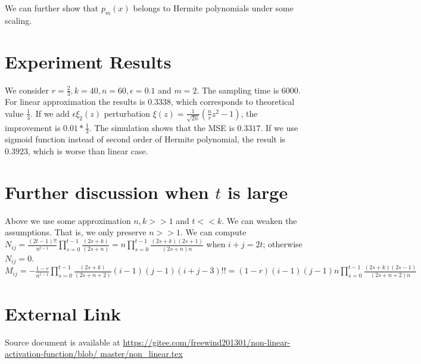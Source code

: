 \documentclass{article}
\begin{document}
We can further show that $p_m(x)$ belongs to Hermite polynomials
under some scaling.

\section{Experiment Results}
We consider $r=\frac{2}{3}, k=40, n=60, \epsilon=0.1$ and $m=2$.
The sampling time is 6000.
For linear approximation the results is $0.3338$,
which corresponds to theoretical value $\frac{1}{3}$.
If we add $\epsilon \xi_2(z)$ perturbation
$\xi(z) = \frac{1}{\sqrt{2n}}(\frac{n}{r} z^2 -1)$,
the improvement is $0.01 * \frac{1}{3}$.
The simulation shows that the MSE is $0.3317$.
If we use sigmoid function instead of second order of Hermite polynomial,
the result is $0.3923$, which is worse than linear case.

\section{Further discussion when $t$ is large}
Above we use some approximation $n, k >> 1$ and $ t << k$.
We can weaken the assumptions. That is, we only preserve $ n >> 1$.
We can compute $N_{ij} =\frac{(2t-1)!!}{n^{t-1}} \prod_{s=0}^{t-1}
\frac{(2s+k)}{(2s+n)} = n
\prod_{s=0}^{t-1} \frac{(2s+k)(2s+1)}{(2s+n)n}$ 
when $i+j = 2t$; otherwise $N_{ij}=0$.
$M_{ij}=-\frac{1-r}{n^{t-1}} \prod_{s=0}^{t-1}
\frac{(2s+k)}{(2s+n+2)} (i-1)(j-1) (i+j-3)!! =
(1-r)(i-1)(j-1)n \prod_{s=0}^{t-1} \frac{(2s+k)(2s-1)}{(2s+n+2)n}$
\section{External Link}
Source document is available at
\url{https://gitee.com/freewind201301/non-linear-activation-function/blob/
master/non_linear.tex}

\appendix
\end{document}
